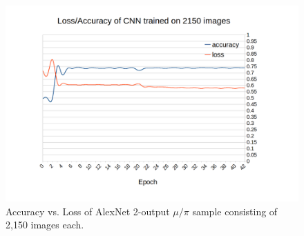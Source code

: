 \begin{figure}[htp!]
\centering
\includegraphics[width=\textwidth]{figs/acc_loss_CNN1075.png}
\caption{Accuracy vs. Loss of AlexNet 2-output $\mu/\pi$ sample consisting of 2,150 images each.} 
\label{fig:loss_accuracy_1075}
\end{figure}


